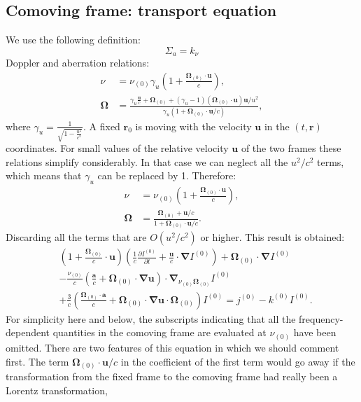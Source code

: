 \documentclass[letterpaper]{report}
\newcommand\bn{\boldsymbol{\nabla}}
\newcommand\bo{\boldsymbol{\Omega}}
\newcommand\bs{\boldsymbol}
\renewcommand{\(}{\left(}
\renewcommand{\)}{\right)}
\renewcommand{\[}{\left[}
\renewcommand{\]}{\right]}
\begin{document}
\subsection{Comoving frame: transport equation}
We use the following definition:
\begin{equation}
  \Sigma_a = k_{\nu}
\end{equation}
Doppler and aberration relations:
\begin{align}
  \nu &= \nu_{(0)} \gamma_u \(1+\frac{\bo_{(0)}\cdot \bs{u}}{c}\),\\
  \bo &= \frac{\gamma_u\frac{\bs{u}}{c}+\bo_{(0)}+(\gamma_u-1)(\bo_{(0)}\cdot
  \bs{u})\bs{u}/u^2}{\gamma_u(1+\bo_{(0)}\cdot \bs{u}/c)},
\end{align}
where $\gamma_u = \frac{1}{\sqrt{1-\frac{u^2}{c^2}}}$. A fixed $\bs{r}_0$ is 
moving with the velocity $\bs{u}$ in the $(t,\bs{r})$ coordinates. For small 
values of the relative velocity $\bs{u}$ of the two frames these relations
simplify considerably. In that case we can neglect all the $u^2/c^2$ terms,
which means that $\gamma_u$ can be replaced by 1. Therefore:
\begin{align}
  \nu &= \nu_{(0)}\(1+\frac{\bo_{(0)}\cdot \bs{u}}{c}\),\\
  \bo &= \frac{\bo_{(0)} + \bs{u}/c}{1+\bo_{(0)}\cdot \bs{u}/c}.
\end{align}
Discarding all the terms that are $O(u^2/c^2)$ or higher. This result is
obtained:
\begin{equation}
  \begin{split}
    &\(1+\frac{\bo_{(0)}}{c}\cdot\bs{u}\)\(\frac{1}{c} \frac{\partial
    I^{(0)}}{\partial t}+\frac{\bs{u}}{c}\cdot\bn I^{(0)}\) + \bo_{(0)} \cdot \bn
    I^{(0)}\\
    &-\frac{\nu_{(0)}}{c}\(\frac{\bs{a}}{c}+\bo_{(0)}\cdot\bn\bs{u}\) \cdot
    \bn_{\nu_{(0)}\bo_{(0)}}I^{(0)}\\
    &+\frac{3}{c}\(\frac{\bo_{(0)}\cdot\bs{a}}{c} + \bo_{(0)}\cdot \bn
    \bs{u}\cdot \bo_{(0)}\) I^{(0)} = j^{(0)} - k^{(0)}I^{(0)}.
  \end{split}
  \label{6.39}
\end{equation}
For simplicity here and below, the subscripts indicating that all the
frequency-dependent quantities in the comoving frame are evaluated at
$\nu_{(0)}$ have been omitted. There are two features of this equation in
which we should comment first. The term $\bo_{(0)}\cdot \bs{u}/c$ in the
coefficient of the first term would go away if the transformation from the
fixed frame to the comoving frame had really been a Lorentz transformation,
\end{document}
